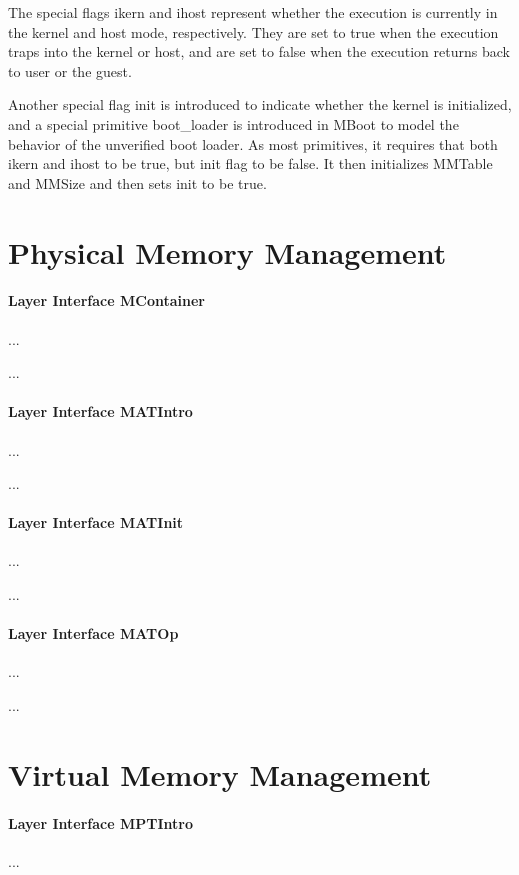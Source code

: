 The special flags \textsf{ikern} and \textsf{ihost} represent whether the execution
is currently in the kernel and host mode, respectively. They are set to \textsf{true}
when the execution traps into the kernel or host, and are set to \textsf{false} when
the execution returns back to user or the guest.


Another special flag \textsf{init} is introduced to indicate whether the kernel
is initialized, and a
special primitive \textsf{boot\_loader} is introduced in MBoot to model
the behavior of the unverified boot loader. As most primitives, it requires that
both \textsf{ikern} and \textsf{ihost} to be \textsf{true}, but \textsf{init}
flag to be \textsf{false}. It then initializes \textsf{MMTable} and \textsf{MMSize}
and then sets \textsf{init} to be \textsf{true}. 


\section{Physical Memory Management}

\paragraph{Layer Interface MContainer}
...

...

\paragraph{Layer Interface MATIntro}
...

...

\paragraph{Layer Interface MATInit}
...

...

\paragraph{Layer Interface MATOp}
...

...

\section{Virtual Memory Management}

\paragraph{Layer Interface MPTIntro}
...

